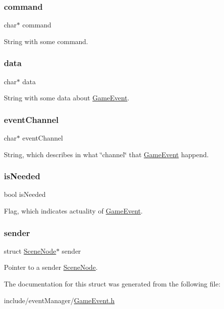 \subsubsection{\texorpdfstring{command}{command}}
{\footnotesize\ttfamily char$\ast$ command}

String with some command. \hypertarget{struct_game_event_a91a70b77df95bd8b0830b49a094c2acb}{}\label{struct_game_event_a91a70b77df95bd8b0830b49a094c2acb} 
\subsubsection{\texorpdfstring{data}{data}}
{\footnotesize\ttfamily char$\ast$ data}

String with some data about \hyperlink{struct_game_event}{Game\+Event}. \hypertarget{struct_game_event_a7dda51a2020c9e6ea2d284527a6c0a3c}{}\label{struct_game_event_a7dda51a2020c9e6ea2d284527a6c0a3c} 
\subsubsection{\texorpdfstring{event\+Channel}{eventChannel}}
{\footnotesize\ttfamily char$\ast$ event\+Channel}

String, which describes in what \char`\"{}channel\char`\"{} that \hyperlink{struct_game_event}{Game\+Event} happend. \hypertarget{struct_game_event_a1c2e66c0da32aeb6b56a788ad2beee8c}{}\label{struct_game_event_a1c2e66c0da32aeb6b56a788ad2beee8c} 
\subsubsection{\texorpdfstring{is\+Needed}{isNeeded}}
{\footnotesize\ttfamily bool is\+Needed}

Flag, which indicates actuality of \hyperlink{struct_game_event}{Game\+Event}. \hypertarget{struct_game_event_a66ff5dae3a3a9fa193714623f219c11d}{}\label{struct_game_event_a66ff5dae3a3a9fa193714623f219c11d} 
\subsubsection{\texorpdfstring{sender}{sender}}
{\footnotesize\ttfamily struct \hyperlink{struct_scene_node}{Scene\+Node}$\ast$ sender}

Pointer to a sender \hyperlink{struct_scene_node}{Scene\+Node}. 

The documentation for this struct was generated from the following file\+:\begin{DoxyCompactItemize}
\item 
include/event\+Manager/\hyperlink{_game_event_8h}{Game\+Event.\+h}\end{DoxyCompactItemize}
